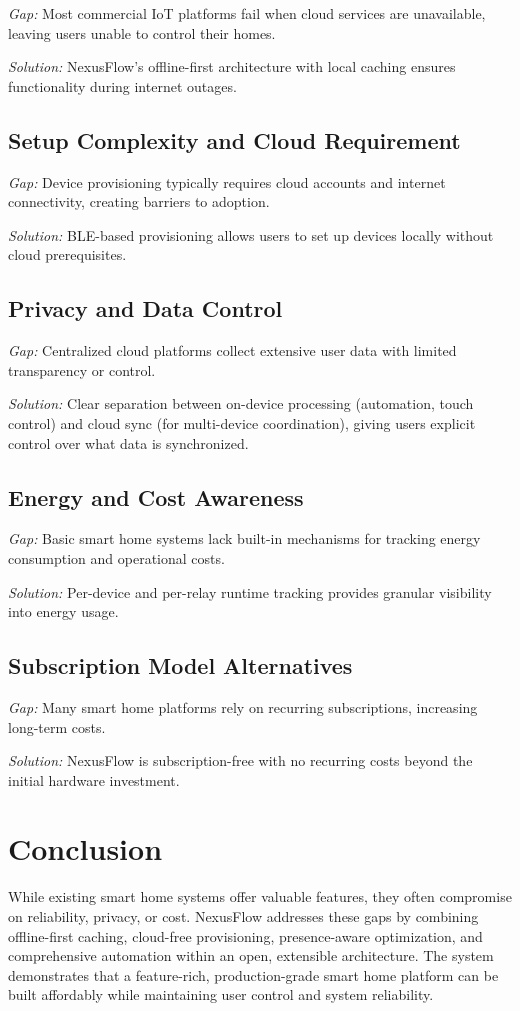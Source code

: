 \textit{Gap:} Most commercial IoT platforms fail when cloud services are unavailable, leaving users unable to control their homes.

\textit{Solution:} NexusFlow's offline-first architecture with local caching ensures functionality during internet outages.

\subsection{Setup Complexity and Cloud Requirement}

\textit{Gap:} Device provisioning typically requires cloud accounts and internet connectivity, creating barriers to adoption.

\textit{Solution:} BLE-based provisioning allows users to set up devices locally without cloud prerequisites.

\subsection{Privacy and Data Control}

\textit{Gap:} Centralized cloud platforms collect extensive user data with limited transparency or control.

\textit{Solution:} Clear separation between on-device processing (automation, touch control) and cloud sync (for multi-device coordination), giving users explicit control over what data is synchronized.

\subsection{Energy and Cost Awareness}

\textit{Gap:} Basic smart home systems lack built-in mechanisms for tracking energy consumption and operational costs.

\textit{Solution:} Per-device and per-relay runtime tracking provides granular visibility into energy usage.

\subsection{Subscription Model Alternatives}

\textit{Gap:} Many smart home platforms rely on recurring subscriptions, increasing long-term costs.

\textit{Solution:} NexusFlow is subscription-free with no recurring costs beyond the initial hardware investment.

\section{Conclusion}

While existing smart home systems offer valuable features, they often compromise on reliability, privacy, or cost. NexusFlow addresses these gaps by combining offline-first caching, cloud-free provisioning, presence-aware optimization, and comprehensive automation within an open, extensible architecture. The system demonstrates that a feature-rich, production-grade smart home platform can be built affordably while maintaining user control and system reliability.
